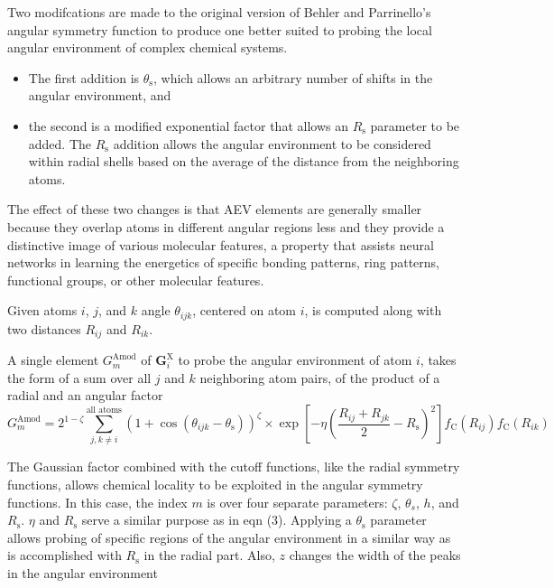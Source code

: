 Two modifcations are made to the original version of Behler
and Parrinello's angular symmetry function to produce one
better suited to probing the local angular environment of
complex chemical systems.
\begin{itemize}
\item The first addition is $\theta_{\mathrm{s}}$, which allows
an arbitrary number of shifts in the angular environment, and
\item the second is a modified exponential factor that allows an
$R_{\mathrm{s}}$ parameter to be added.
The $R_{\mathrm{s}}$ addition allows the angular
environment to be considered within radial shells based on the
average of the distance from the neighboring atoms.
\end{itemize}

The effect
of these two changes is that AEV elements are generally smaller
because they overlap atoms in different angular regions less and
they provide a distinctive image of various molecular features,
a property that assists neural networks in learning the energetics
of specific bonding patterns, ring patterns, functional groups, or
other molecular features.

Given atoms $i$, $j$, and $k$ angle $\theta_{ijk}$, centered on atom $i$,
is computed along with two distances $R_{ij}$ and $R_{ik}$.

A single element $G_{m}^{\mathrm{Amod}}$ of $\mathbf{G}_{i}^{\mathrm{X}}$
to probe the angular environment of atom $i$, takes the form of a sum over
all $j$ and $k$ neighboring atom pairs, of the product of a radial and an
angular factor
\begin{equation}
G_{m}^{\mathrm{Amod}} = 2^{1-\zeta}
\sum_{j,k \neq i}^{\text{all atoms}}
\left( 1 + \cos(\theta_{ijk} - \theta_{\mathrm{s}}) \right)^{\zeta}
\times
\exp\left[ -\eta \left( \dfrac{R_{ij} + R_{jk}}{2} -
R_{\mathrm{s}} \right)^2 \right]
f_{\mathrm{C}}(R_{ij}) f_{\mathrm{C}}(R_{ik})
\end{equation}

The Gaussian factor combined with the cutoff functions, like
the radial symmetry functions, allows chemical locality to be
exploited in the angular symmetry functions.
In this case, the index $m$ is over four separate
parameters: $\zeta$, $\theta_{s}$,
$h$, and $R_{\mathrm{s}}$.
$\eta$ and $R_{\mathrm{s}}$ serve a similar purpose as in eqn (3).
Applying a $\theta_{\mathrm{s}}$ parameter
allows probing of specific regions of the angular environment in
a similar way as is accomplished with $R_{\mathrm{s}}$ in the radial part.
Also, $z$ changes the width of the peaks in the angular environment
